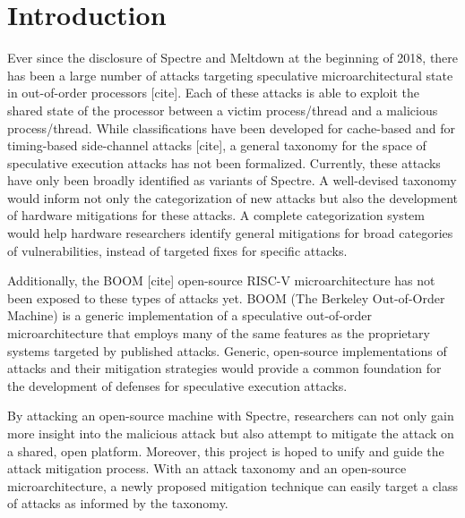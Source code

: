 \section{Introduction}
Ever since the disclosure of Spectre and Meltdown at the beginning of 2018, there has been a large number of attacks targeting speculative microarchitectural state in out-of-order processors [cite].%
%
Each of these attacks is able to exploit the shared state of the processor between a victim process/thread and a malicious process/thread.%
%
While classifications have been developed for cache-based and for timing-based side-channel attacks [cite], a general taxonomy for the space of speculative execution attacks has not been formalized.%
%
Currently, these attacks have only been broadly identified as variants of Spectre.%
%
A well-devised taxonomy would inform not only the categorization of new attacks but also the development of hardware mitigations for these attacks.%
%
A complete categorization system would help hardware researchers identify general mitigations for broad categories of vulnerabilities, instead of targeted fixes for specific attacks.%
%

Additionally, the BOOM [cite] open-source RISC-V microarchitecture has not been exposed to these types of attacks yet.%
%
BOOM (The Berkeley Out-of-Order Machine) is a generic implementation of a speculative out-of-order microarchitecture that employs many of the same features as the proprietary systems targeted by published attacks.%
%
Generic, open-source implementations of attacks and their mitigation strategies would provide a common foundation for the development of defenses for speculative execution attacks.%
%

By attacking an open-source machine with Spectre, researchers can not only gain more insight into the malicious attack but also attempt to mitigate the attack on a shared, open platform.%
%
Moreover, this project is hoped to unify and guide the attack mitigation process.%
%
With an attack taxonomy and an open-source microarchitecture, a newly proposed mitigation technique can easily target a class of attacks as informed by the taxonomy.


